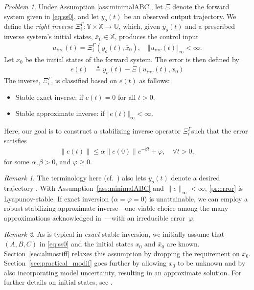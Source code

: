 \documentclass[journal]{IEEEtran}
\theoremstyle{remark}
\newtheorem{remark}{Remark}
\newtheorem{problem}{Problem}
\begin{document}
\begin{problem} \label{pr:problem definition}
{Under Assumption \ref{ass:minimalABC}, let \(\Xi\) denote the forward system given in \eqref{eq:ss0}, and let \(y_o(t)\) be an observed output trajectory. We define the \textit{right inverse} $\Xi_i^\Gamma: \mathbb{Y}\times\mathbb{X}\to\mathbb{U}$, which, given $y_o(t)$ and a prescribed inverse system's initial states, $\bar{x}_0 \in \mathbb{X}$, produces the control input
\begin{align} \label{eq:uinvpr}
u_{inv}(t) = \Xi_{i}^\Gamma(y_o(t),\bar{x}_0), \quad \Vert u_{inv}(t) \Vert_\infty < \infty.
\end{align}
Let $x_0$ be the initial states of the forward system. The error is then defined by
\begin{align} \label{pr:error}
    e(t) &\triangleq  y_o(t)-\Xi(u_{inv}(t),x_0) 
\end{align}
The inverse, $\Xi_i^\Gamma$,} is classified based on $e(t)$ as follows:
\begin{itemize}
   \item[a.]  {Stable exact inverse}: if \( e(t) = 0 \) for all \( t > 0 \).
   \item[b.]  {Stable approximate inverse}: if \( \Vert e(t) \Vert_\infty < \infty \).
\end{itemize}
Here, our goal is to construct a stabilizing inverse operator \( \Xi_i^\Gamma \)such that the error satisfies
\begin{align}\label{ESwithinevitabeerrors}
   \| e(t)\| \leq \alpha \|e(0)\| e^{-\beta t} + \varphi, \quad \forall t > 0,
\end{align}
for some $\alpha, \beta > 0$, and $\varphi \geq 0$.
\end{problem}
\begin{remark} \label{rem:similarproblems}
The terminology here (cf.\ \cite{estrada2007left}) also lets $y_o(t)$ denote a desired trajectory \cite{naderi2018inversion}.  With Assumption~\ref{ass:minimalABC} and $\|e\|_\infty<\infty$, \eqref{pr:error} is Lyapunov-stable. If exact inversion ($\alpha=\varphi=0$) is unattainable, we can employ a robust stabilizing approximate inverse—one viable choice among the many approximations acknowledged in~\cite{romagnoli2019general}—with an irreducible error~$\varphi$.
\end{remark}
\begin{remark}\label{rem:ic}  
As is typical in \textit{exact} stable inversion, we initially assume that \((A, B, C)\) in \eqref{eq:ss0} and the initial states \(x_0\) and  \(\bar{x}_0\) are known. Section~\ref{sec:almostiff} relaxes this assumption by dropping the requirement on \(\bar x_0\).
Section~\ref{sec:practical_modif} goes further by allowing \(x_0\) to be unknown and by also incorporating model uncertainty, resulting in an approximate solution. For further details on initial states, see \cite{Loreto2023}.
\end{remark}
\end{document}
